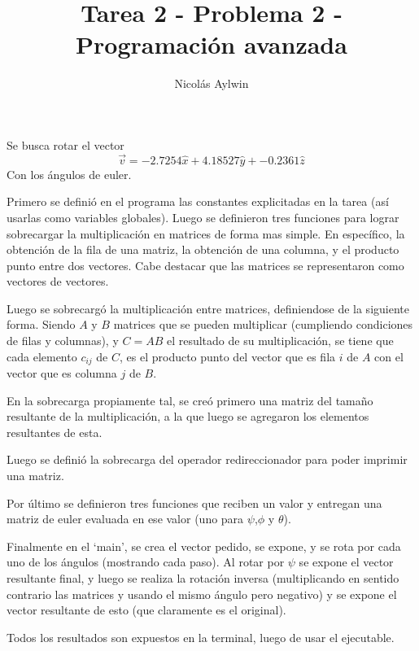 \documentclass[12pt]{article}
\title{Tarea 2 - Problema 2 - Programación avanzada}
\author{Nicolás Aylwin}
\date{}
\begin{document}
\maketitle
Se busca rotar el vector
\begin{equation*}
\vec{v}=-2.7254\hat{x}+4.18527\hat{y}+-0.2361\hat{z}
\end{equation*}
Con los ángulos de euler.

Primero se definió en el programa las constantes explicitadas en la tarea (así usarlas como variables globales). Luego se definieron tres funciones para lograr sobrecargar la multiplicación en matrices de forma mas simple. En específico, la obtención de la fila de una matriz, la obtención de una columna, y el producto punto entre dos vectores. Cabe destacar que las matrices se representaron como vectores de vectores.

Luego se sobrecargó la multiplicación entre matrices, definiendose de la siguiente forma. Siendo $A$ y $B$ matrices que se pueden multiplicar (cumpliendo condiciones de filas y columnas), y $C=AB$ el resultado de su multiplicación, se tiene que cada elemento $c_{ij}$ de $C$, es el producto punto del vector que es fila $i$ de $A$ con el vector que es columna $j$ de $B$.

En la sobrecarga propiamente tal, se creó primero una matriz del tamaño resultante de la multiplicación, a la que luego se agregaron los elementos resultantes de esta.

Luego se definió la sobrecarga del operador redireccionador para poder imprimir una matriz.

Por último se definieron tres funciones que reciben un valor y entregan una matriz de euler evaluada en ese valor (uno para $\psi$,$\phi$ y $\theta$).

Finalmente en el `main', se crea el vector pedido, se expone, y se rota por cada uno de los ángulos (mostrando cada paso). Al rotar por $\psi$ se expone el vector resultante final, y luego se realiza la rotación inversa (multiplicando en sentido contrario las matrices y usando el mismo ángulo pero negativo) y se expone el vector resultante de esto (que claramente es el original).

Todos los resultados son expuestos en la terminal, luego de usar el ejecutable.  
\end{document}
